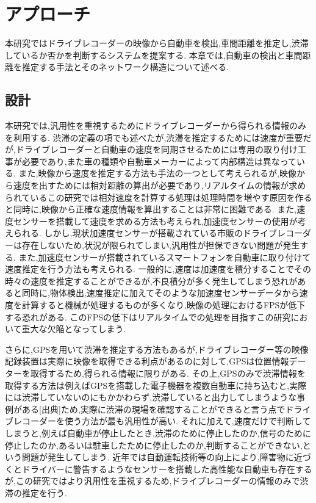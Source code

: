 %
%
%
%
\chapter{アプローチ}
本研究ではドライブレコーダーの映像から自動車を検出,車間距離を推定し,渋滞しているか否かを判断するシステムを提案する.
本章では,自動車の検出と車間距離を推定する手法とそのネットワーク構造について述べる.

\section{設計}
本研究では,汎用性を重視するためにドライブレコーダーから得られる情報のみを利用する.
渋滞の定義の項でも述べたが,渋滞を推定するためには速度が重要だが,ドライブレコーダーと自動車の速度を同期させるためには専用の取り付け工事が必要であり,また車の種類や自動車メーカーによって内部構造は異なっている.
また,映像から速度を推定する方法も手法の一つとして考えられるが,映像から速度を出すためには相対距離の算出が必要であり,リアルタイムの情報が求められているこの研究では相対速度を計算する処理は処理時間を増やす原因を作ると同時に,映像から正確な速度情報を算出することは非常に困難である.
また,速度センサーを搭載して速度を求める方法も考えられ,加速度センサーの使用が考えられる.
しかし,現状加速度センサーが搭載されている市販のドライブレコーダーは存在しないため,状況が限られてしまい,汎用性が担保できない問題が発生する.
また,加速度センサーが搭載されているスマートフォンを自動車に取り付けて速度推定を行う方法も考えられる.
一般的に,速度は加速度を積分することでその時々の速度を推定することができるが,不良積分が多く発生してしまう恐れがあると同時に,物体検出,速度推定に加えてそのような加速度センサーデータから速度を計算すると機械が処理するものが多くなり,映像の処理におけるFPSが低下する恐れがある.
このFPSの低下はリアルタイムでの処理を目指すこの研究において重大な欠陥となってしまう.

さらに,GPSを用いて渋滞を推定する方法もあるが,ドライブレコーダー等の映像記録装置は実際に映像を取得できる利点があるのに対して,GPSは位置情報データーを取得するため,得られる情報に限りがある.
その上,GPSのみで渋滞情報を取得する方法は例えばGPSを搭載した電子機器を複数自動車に持ち込むと,実際には渋滞していないのにもかかわらず,渋滞していると出力してしまうような事例がある[出典]ため,実際に渋滞の現場を確認することができると言う点でドライブレコーダーを使う方法が最も汎用性が高い.
それに加えて,速度だけで判断してしまうと,例えば自動車が停止したとき,渋滞のために停止したのか,信号のために停止したのか,あるいは駐車したために停止したのか,判断することができない,という問題が発生してしまう.
近年では自動運転技術等の向上により,障害物に近づくとドライバーに警告するようなセンサーを搭載した高性能な自動車も存在するが,この研究ではより汎用性を重視するため,ドライブレコーダーの情報のみで渋滞の推定を行う.

